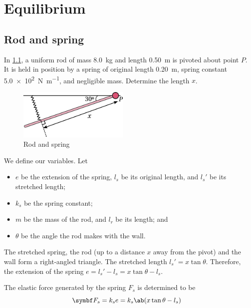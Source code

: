 \chapter{Equilibrium}

\section{Rod and spring}
\begin{problem}
  In \cref{fig:rodspring}, a uniform rod of mass \qty{8.0}{\kg} and
  length \qty{0.50}{\metre}
  is pivoted about point \(P\). It is held in position by a spring of
  original length \qty{0.20}{\metre},
  spring constant \qty{5.0e2}{\newton\per\metre}, and negligible mass.
  Determine the length \(x\).
\end{problem}
\begin{figure}
  \centering
  \includegraphics[width=0.48\textwidth]{assets/rodspring.png}
  \caption{Rod and spring}
  \label{fig:rodspring}
\end{figure}
We define our variables. Let
\begin{itemize}
  \item \(e\) be the extension of the spring, \(l_s\) be its original
    length, and \({l_s}'\) be its stretched length;
  \item \(k_s\) be the spring constant;
  \item \(m\) be the mass of the rod, and \(l_r\) be its length; and
  \item \(\theta\) be the angle the rod makes with the wall.
\end{itemize}

The stretched spring, the rod (up to a distance \(x\) away from the
pivot) and the wall
form a right-angled triangle. The stretched length \({l_s}' = x \tan \theta\).
Therefore, the extension of the spring \(e = {l_s}'-l_s = x\tan\theta - l_s\).

The elastic force generated by the spring \(F_s\) is determined to be
\begin{equation}
  \mv{F}_s = k_se = k_s\ab(x\tan\theta-l_s)
  \label{eq:elastic}
\end{equation}

